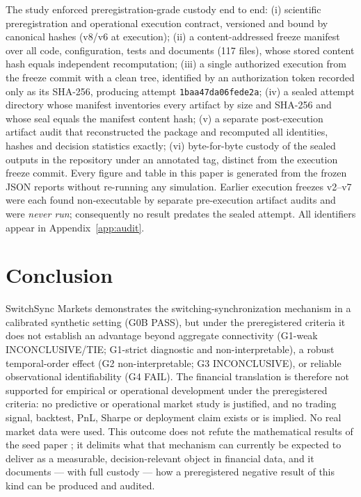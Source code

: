 \documentclass[11pt]{article}
\begin{document}
The study enforced preregistration-grade custody end to end:
(i) scientific preregistration and operational execution contract, versioned
and bound by canonical hashes (v8/v6 at execution);
(ii) a content-addressed freeze manifest over all code, configuration, tests
and documents (117 files), whose stored content hash equals independent
recomputation;
(iii) a single authorized execution from the freeze commit with a clean tree,
identified by an authorization token recorded only as its SHA-256, producing
attempt \texttt{1baa47da06fede2a};
(iv) a sealed attempt directory whose manifest inventories every artifact by
size and SHA-256 and whose seal equals the manifest content hash;
(v) a separate post-execution artifact audit that reconstructed the package
and recomputed all identities, hashes and decision statistics exactly;
(vi) byte-for-byte custody of the sealed outputs in the repository under an
annotated tag, distinct from the execution freeze commit.
Every figure and table in this paper is generated from the frozen JSON
reports without re-running any simulation. Earlier execution freezes v2--v7
were each found non-executable by separate pre-execution artifact audits and
were \emph{never run}; consequently no result predates the sealed attempt. All identifiers
appear in Appendix~\ref{app:audit}.

\section{Conclusion}
\label{sec:conclusion}

SwitchSync Markets demonstrates the switching-synchronization mechanism in a
calibrated synthetic setting (G0B PASS), but under the preregistered criteria
it does not establish an advantage beyond aggregate connectivity (G1-weak
INCONCLUSIVE/TIE; G1-strict diagnostic and non-interpretable), a robust
temporal-order effect (G2 non-interpretable; G3 INCONCLUSIVE), or reliable
observational identifiability (G4 FAIL). The financial translation is
therefore not supported for empirical or operational development under the
preregistered criteria: no predictive or operational market study is
justified, and no trading signal, backtest, PnL, Sharpe or deployment claim
exists or is implied. No real market data were used. This outcome does not
refute the mathematical results of the seed paper
\citep{eser2025switching}; it delimits what that mechanism can currently be
expected to deliver as a measurable, decision-relevant object in financial
data, and it documents --- with full custody --- how a preregistered negative
result of this kind can be produced and audited.
\end{document}
